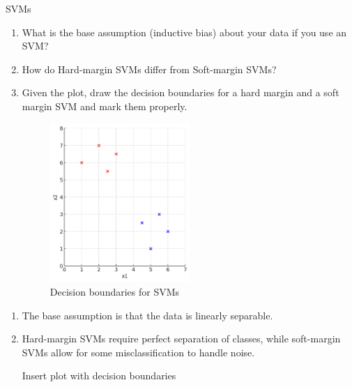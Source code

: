 \documentclass{article}
\begin{document}
\begin{exercise}{SVMs}
  \begin{enumerate}
    \item What is the base assumption (inductive bias) about your data if you use an SVM?
    \item How do Hard-margin SVMs differ from Soft-margin SVMs?
    \item Given the plot, draw the decision boundaries for a hard margin and a soft margin SVM and mark them properly.
      \begin{figure}
        \centering
        \includegraphics[width=0.5\textwidth]{res/svm_decision_boundary.png}
        \caption{Decision boundaries for SVMs}
        \label{fig:svm_decision_boundary}
      \end{figure}
  \end{enumerate}

  \begin{solution}
    \begin{enumerate}
      \item The base assumption is that the data is linearly separable.
      \item Hard-margin SVMs require perfect separation of classes, while soft-margin SVMs allow for some misclassification to handle noise.
      \item [Insert plot with decision boundaries]
    \end{enumerate}
  \end{solution}
\end{exercise}
\end{document}
